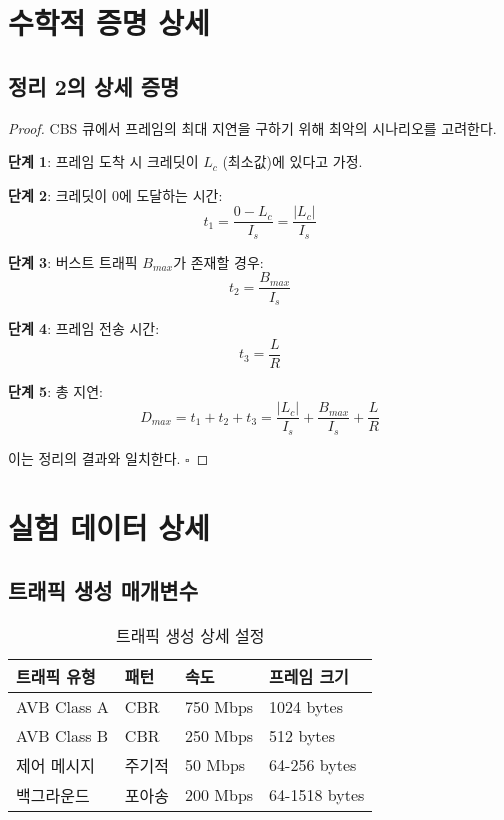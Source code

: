 \documentclass[12pt, a4paper]{article}
\begin{document}



\appendix

\section{수학적 증명 상세}

\subsection{정리 2의 상세 증명}

\begin{proof}
CBS 큐에서 프레임의 최대 지연을 구하기 위해 최악의 시나리오를 고려한다.

\textbf{단계 1}: 프레임 도착 시 크레딧이 $L_c$ (최소값)에 있다고 가정.

\textbf{단계 2}: 크레딧이 0에 도달하는 시간:
\begin{equation}
t_1 = \frac{0 - L_c}{I_s} = \frac{|L_c|}{I_s}
\end{equation}

\textbf{단계 3}: 버스트 트래픽 $B_{max}$가 존재할 경우:
\begin{equation}
t_2 = \frac{B_{max}}{I_s}
\end{equation}

\textbf{단계 4}: 프레임 전송 시간:
\begin{equation}
t_3 = \frac{L}{R}
\end{equation}

\textbf{단계 5}: 총 지연:
\begin{equation}
D_{max} = t_1 + t_2 + t_3 = \frac{|L_c|}{I_s} + \frac{B_{max}}{I_s} + \frac{L}{R}
\end{equation}

이는 정리의 결과와 일치한다. $\square$
\end{proof}

\section{실험 데이터 상세}

\subsection{트래픽 생성 매개변수}

\begin{table}[H]
\centering
\caption{트래픽 생성 상세 설정}
\begin{tabular}{llll}
\toprule
\textbf{트래픽 유형} & \textbf{패턴} & \textbf{속도} & \textbf{프레임 크기} \\
\midrule
AVB Class A & CBR & 750 Mbps & 1024 bytes \\
AVB Class B & CBR & 250 Mbps & 512 bytes \\
제어 메시지 & 주기적 & 50 Mbps & 64-256 bytes \\
백그라운드 & 포아송 & 200 Mbps & 64-1518 bytes \\
\bottomrule
\end{tabular}
\end{table}
\end{document}

